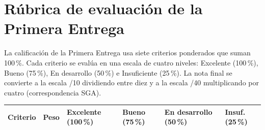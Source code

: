 \documentclass[11pt,a4paper]{article}
\begin{document}
\section{R\'ubrica de evaluaci\'on de la Primera Entrega}\label{sec:evaluacion}

La calificaci\'on de la Primera Entrega usa siete criterios ponderados que suman 100\,\%. Cada criterio se eval\'ua en una escala de cuatro niveles: Excelente (100\,\%), Bueno (75\,\%), En desarrollo (50\,\%) e Insuficiente (25\,\%). La nota final se convierte a la escala /10 dividiendo entre diez y a la escala /40 multiplicando por cuatro (correspondencia SGA).

\begin{longtable}{|L{4.3cm}|C{0.9cm}|L{3.3cm}|L{2.4cm}|L{2.4cm}|L{1.6cm}|}
\hline
{}
\textbf{Criterio} & \textbf{Peso} & \textbf{Excelente (100\,\%)} & \textbf{Bueno (75\,\%)} & \textbf{En desarrollo (50\,\%)} & \textbf{Insuf. (25\,\%)}\\ \hline
\endhead


\end{longtable}
\end{document}
